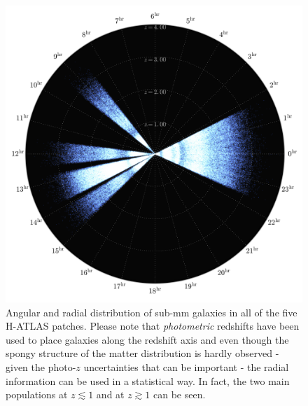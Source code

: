 \begin{figure} %
\centering %
\includegraphics[width=\textwidth]{Chapter2/Images/hatlas3d}
\caption{Angular and radial distribution of sub-mm galaxies in all of the five H-ATLAS patches. 
Please note that \textit{photometric} redshifts have been used to place galaxies along the redshift
axis and even though the spongy structure of the matter distribution is hardly observed - given the photo-$z$ 
uncertainties that can be important - the radial information can be used in a statistical way. 
In fact, the two main populations at $z \lesssim 1$ and at $z \gtrsim 1$ can be seen. \label{fig:hatlas3D}}
\end{figure}
